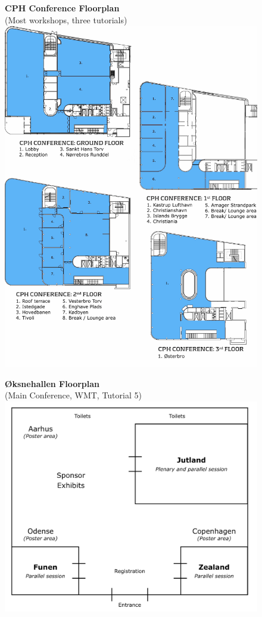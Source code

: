 \begin{figure}[p]
\centering
\textbf{CPH Conference Floorplan}\\
(Most workshops, three tutorials)
\vspace{3em}
\includegraphics[width=\textwidth]{content/fmatter/floorplan_DGI_w_grid.pdf}
\end{figure}

\begin{figure}[p]
\centering
\textbf{Øksnehallen Floorplan}\\
(Main Conference, WMT, Tutorial 5)
\vspace{10em}
\includegraphics[width=\textwidth]{content/fmatter/floorplan_oeksnehallen.png}
\end{figure}
